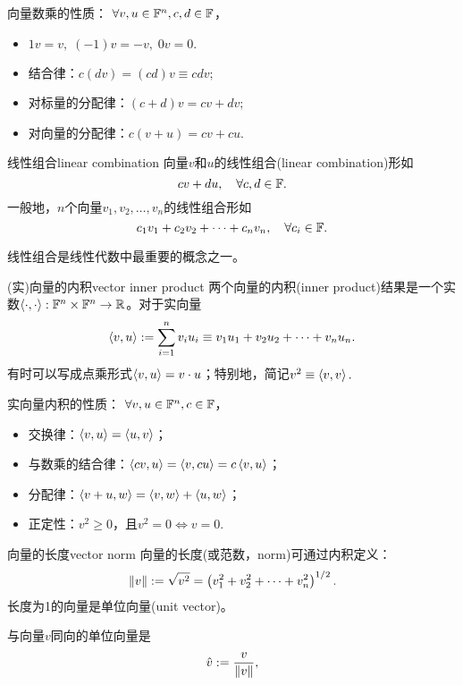 \begin{corollary}
	向量数乘的性质：%
	$\forall v,u\in\mathbb F^n,c,d\in\mathbb F$，
    \begin{itemize}
    	\item $1v=v,\;(-1)v=-v,\;0v=0.$
    	\item 结合律：$c(dv)=(cd)v\equiv cdv;$
    	\item 对标量的分配律：$(c+d)v=cv+dv;$
    	\item 对向量的分配律：$c(v+u)=cv+cu.$
    \end{itemize}
\end{corollary}

\begin{definition}{线性组合}{linear combination}
	向量$v$和$u$的线性组合(linear combination)形如
	\[
		cv+du,\quad\forall c,d\in\mathbb F.
	\]
	一般地，$n$个向量$v_1,v_2,\ldots,v_n$的线性组合形如
	\[
		c_1v_1+c_2v_2+\cdots+c_nv_n,\quad\forall c_i\in\mathbb F.
	\]
\end{definition}

\begin{remark}
	线性组合是线性代数中最重要的概念之一。
\end{remark}

\begin{definition}{(实)向量的内积}{vector inner product}
	两个向量的内积(inner product)结果是一个实数$\left\langle \cdot,\cdot\right\rangle:\mathbb F^n\times\mathbb F^n\to\mathbb R$。对于实向量
	\begin{equation}
		\left\langle v,u\right\rangle:=\sum_{i=1}^nv_iu_i\equiv v_1u_1+v_2u_2+\cdots+v_nu_n.
	\end{equation}
	有时可以写成点乘形式$\left\langle v,u\right\rangle=v\cdot u$；特别地，简记$v^2\equiv\left\langle v,v\right\rangle.$
\end{definition}

\begin{corollary}
	实向量内积的性质：%
	$\forall v,u\in\mathbb F^n,c\in\mathbb F$，
    \begin{itemize}
    	\item 交换律：$\left\langle v,u\right\rangle=\left\langle u,v\right\rangle$；
    	\item 与数乘的结合律：$\left\langle cv,u\right\rangle=\left\langle v,cu\right\rangle=c\left\langle v,u\right\rangle$；
    	\item 分配律：$\left\langle v+u,w\right\rangle=\left\langle v,w\right\rangle+\left\langle u,w\right\rangle$；
    	\item 正定性：$v^2\geqslant 0$，且$v^2=0\iff v=0.$
    \end{itemize}
\end{corollary}

\begin{definition}{向量的长度}{vector norm}
	向量的长度(或范数，norm)可通过内积定义：
	\begin{equation}
		\left\lVert v\right\rVert:=\sqrt{v^2}=\left(v_1^2+v_2^2+\cdots+v_n^2\right)^{1/2}.
	\end{equation}
	长度为1的向量是单位向量(unit vector)。
\end{definition}
\begin{corollary}
	与向量$v$同向的单位向量是
	\begin{equation}
		\hat v:=\frac{v}{\left\lVert v\right\rVert},
	\end{equation}
\end{corollary}

